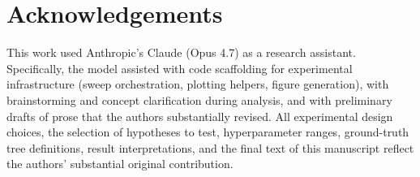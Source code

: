 \section*{Acknowledgements}

This work used Anthropic's Claude (Opus 4.7) as a research assistant.
Specifically, the model assisted with code scaffolding for experimental
infrastructure (sweep orchestration, plotting helpers, figure
generation), with brainstorming and concept clarification during
analysis, and with preliminary drafts of prose that the authors
substantially revised. All experimental design choices, the selection
of hypotheses to test, hyperparameter ranges, ground-truth tree
definitions, result interpretations, and the final text of this
manuscript reflect the authors' substantial original contribution.
